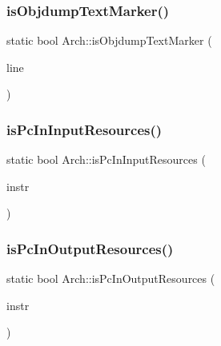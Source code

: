 \subsubsection{\texorpdfstring{is\+Objdump\+Text\+Marker()}{isObjdumpTextMarker()}}
{\footnotesize\ttfamily static bool Arch\+::is\+Objdump\+Text\+Marker (\begin{DoxyParamCaption}\item[{const string \&}]{line }\end{DoxyParamCaption})\hspace{0.3cm}{\ttfamily [static]}}

\mbox{\label{classArch_afd6a6932c55aa195196b2c08936e4696}} 
\subsubsection{\texorpdfstring{is\+Pc\+In\+Input\+Resources()}{isPcInInputResources()}}
{\footnotesize\ttfamily static bool Arch\+::is\+Pc\+In\+Input\+Resources (\begin{DoxyParamCaption}\item[{const \hyperlink{classObjdumpInstruction}{Objdump\+Instruction} \&}]{instr }\end{DoxyParamCaption})\hspace{0.3cm}{\ttfamily [static]}}

\mbox{\label{classArch_ae9c76e4a1181bc72d5babaac8a0521cf}} 
\subsubsection{\texorpdfstring{is\+Pc\+In\+Output\+Resources()}{isPcInOutputResources()}}
{\footnotesize\ttfamily static bool Arch\+::is\+Pc\+In\+Output\+Resources (\begin{DoxyParamCaption}\item[{const \hyperlink{classObjdumpInstruction}{Objdump\+Instruction} \&}]{instr }\end{DoxyParamCaption})\hspace{0.3cm}{\ttfamily [static]}}

\mbox{\label{classArch_ace290b0da62662b592bdfdf3e3c334c1}} 

